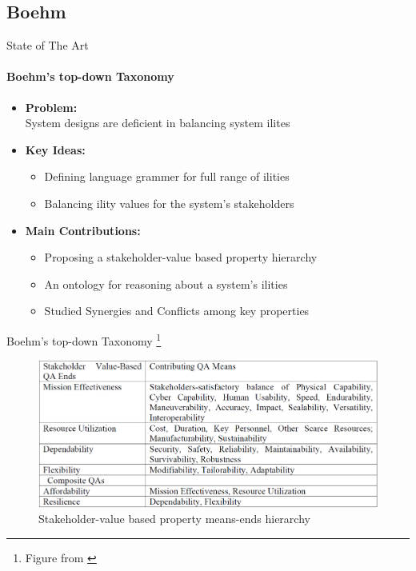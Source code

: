 \documentclass[xcolor=x11names,compress]{beamer}
\renewcommand{\(}{\begin{columns}}
\renewcommand{\)}{\end{columns}}
\newcommand{\<}[1]{\begin{column}{#1}}
\renewcommand{\>}{\end{column}}
\begin{document}
\subsection{Boehm}
\begin{frame}{State of The Art}
\framesubtitle{Boehm's top-down Taxonomy \cite{Boehm:ontology}}
\begin{itemize}
\item \textbf{Problem:}\\System designs are deficient in balancing system ilites
\item \textbf{Key Ideas:}
	\begin{itemize}
	\item Defining language grammer for full range of ilities
	\item Balancing ility values for the system's stakeholders
	\end{itemize}
\item \textbf{Main Contributions:}
\begin{itemize}
\item Proposing a stakeholder-value based property hierarchy
\item An ontology for reasoning about a system's ilities
\item Studied Synergies and Conflicts among key properties
\end{itemize}
\end{itemize}
\end{frame}


\begin{frame}{Boehm's top-down Taxonomy \footnote{Figure from \cite{Boehm:ontology}}}
\begin{figure}
\includegraphics[scale=0.28]{figures/hierarchy}
\caption{Stakeholder-value based property means-ends hierarchy}
\end{figure}
\end{frame}
\end{document}
